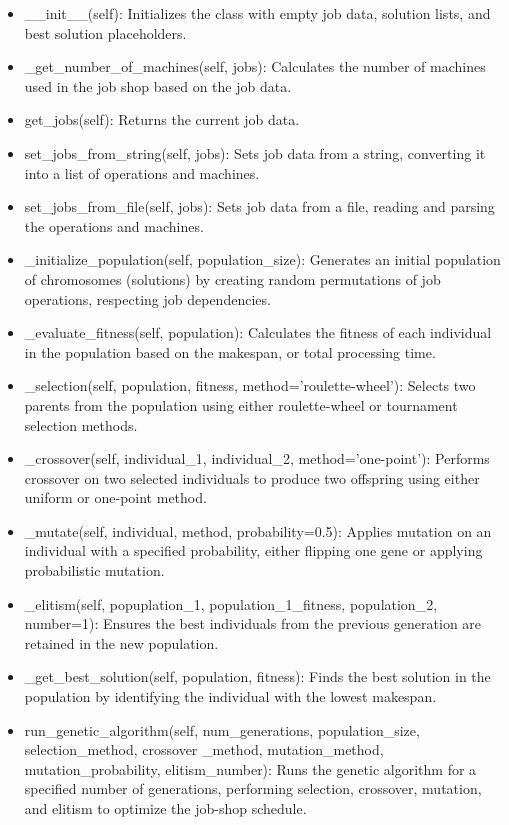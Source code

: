 \documentclass[11pt, a4paper]{article}
\begin{document}
\begin{itemize}
    \item \_\_init\_\_(self): Initializes the class with empty job data, solution lists, and best solution placeholders.
    \item \_get\_number\_of\_machines(self, jobs): Calculates the number of machines used in the job shop based on the job data.
    \item get\_jobs(self): Returns the current job data.
    \item set\_jobs\_from\_string(self, jobs): Sets job data from a string, converting it into a list of operations and machines.
    \item set\_jobs\_from\_file(self, jobs): Sets job data from a file, reading and parsing the operations and machines.
    \item \_initialize\_population(self, population\_size): Generates an initial population of chromosomes (solutions) by creating random permutations of job operations, respecting job dependencies.
    \item \_evaluate\_fitness(self, population): Calculates the fitness of each individual in the population based on the makespan, or total processing time.
    \item \_selection(self, population, fitness, method='roulette-wheel'): Selects two parents from the population using either roulette-wheel or tournament selection methods.
    \item \_crossover(self, individual\_1, individual\_2, method='one-point'): Performs crossover on two selected individuals to produce two offspring using either uniform or one-point method.
    \item \_mutate(self, individual, method, probability=0.5): Applies mutation on an individual with a specified probability, either flipping one gene or applying probabilistic mutation.
    \item \_elitism(self, popuplation\_1, population\_1\_fitness, population\_2, number=1): Ensures the best individuals from the previous generation are retained in the new population.
    \item \_get\_best\_solution(self, population, fitness): Finds the best solution in the population by identifying the individual with the lowest makespan.
    \item run\_genetic\_algorithm(self, num\_generations, population\_size, selection\_method, crossover \_method, mutation\_method, mutation\_probability, elitism\_number): Runs the genetic algorithm for a specified number of generations, performing selection, crossover, mutation, and elitism to optimize the job-shop schedule.
\end{itemize}
\end{document}
